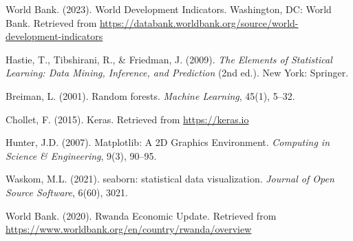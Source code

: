 \documentclass[12pt]{article}
\begin{document}
	\begin{thebibliography}{9}
		World Bank. (2023). World Development Indicators. Washington, DC: World Bank. Retrieved from \url{https://databank.worldbank.org/source/world-development-indicators}
		
		Hastie, T., Tibshirani, R., \& Friedman, J. (2009). \textit{The Elements of Statistical Learning: Data Mining, Inference, and Prediction} (2nd ed.). New York: Springer.
		
		Breiman, L. (2001). Random forests. \textit{Machine Learning}, 45(1), 5--32.
		
		Chollet, F. (2015). Keras. Retrieved from \url{https://keras.io}
		
		Hunter, J.D. (2007). Matplotlib: A 2D Graphics Environment. \textit{Computing in Science \& Engineering}, 9(3), 90--95.
		
		Waskom, M.L. (2021). seaborn: statistical data visualization. \textit{Journal of Open Source Software}, 6(60), 3021.
		
		World Bank. (2020). Rwanda Economic Update. Retrieved from \url{https://www.worldbank.org/en/country/rwanda/overview}
	\end{thebibliography}
	
\end{document}
